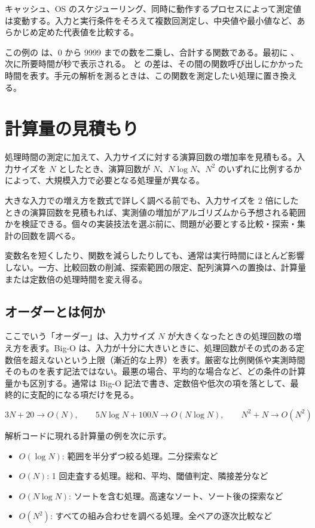 キャッシュ、OS のスケジューリング、同時に動作するプロセスによって測定値は変動する。入力と実行条件をそろえて複数回測定し、中央値や最小値など、あらかじめ定めた代表値を比較する。

この例の  は、0 から 9999 までの数を二乗し、合計する関数である。最初に 、次に所要時間が秒で表示される。 と  の差は、その間の関数呼び出しにかかった時間を表す。手元の解析を測るときは、この関数を測定したい処理に置き換える。

\section{計算量の見積もり}

処理時間の測定に加えて、入力サイズに対する演算回数の増加率を見積もる。入力サイズを $N$ としたとき、演算回数が $N$、$N \log N$、$N^2$ のいずれに比例するかによって、大規模入力で必要となる処理量が異なる。

大きな入力での増え方を数式で詳しく調べる前でも、入力サイズを 2 倍にしたときの演算回数を見積もれば、実測値の増加がアルゴリズムから予想される範囲かを検証できる。個々の実装技法を選ぶ前に、問題が必要とする比較・探索・集計の回数を調べる。

変数名を短くしたり、関数を減らしたりしても、通常は実行時間にほとんど影響しない。一方、比較回数の削減、探索範囲の限定、配列演算への置換は、計算量または定数倍の処理時間を変え得る。

\subsection{オーダーとは何か}

ここでいう「オーダー」は、入力サイズ $N$ が大きくなったときの処理回数の増え方を表す。Big-O は、入力が十分に大きいときに、処理回数がその式のある定数倍を超えないという上限（漸近的な上界）を表す。厳密な比例関係や実測時間そのものを表す記法ではない。最悪の場合、平均的な場合など、どの条件の計算量かも区別する。通常は Big-O 記法で書き、定数倍や低次の項を落として、最終的に支配的になる項だけを見る。

\[
3N + 20 \rightarrow O(N), \qquad
5N \log N + 100N \rightarrow O(N \log N), \qquad
N^2 + N \rightarrow O(N^2)
\]

解析コードに現れる計算量の例を次に示す。

\begin{itemize}
\item $O(\log N)$: 範囲を半分ずつ絞る処理。二分探索など
\item $O(N)$: 1 回走査する処理。総和、平均、閾値判定、隣接差分など
\item $O(N \log N)$: ソートを含む処理。高速なソート、ソート後の探索など
\item $O(N^2)$: すべての組み合わせを調べる処理。全ペアの逐次比較など
\end{itemize}

